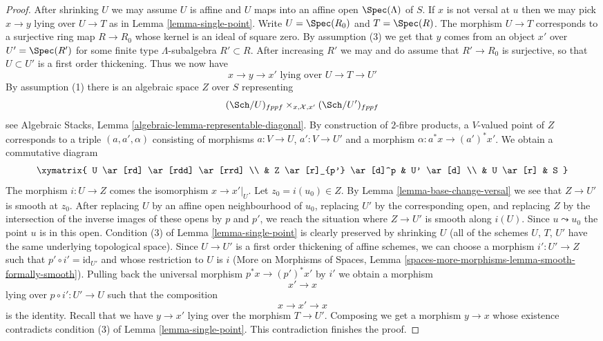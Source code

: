 \begin{proof}
After shrinking $U$ we may assume $U$ is affine and $U$ maps into an
affine open $\Spec(\Lambda)$ of $S$. If $x$ is not versal at $u$ then
we may pick $x \to y$ lying over $U \to T$ as in
Lemma \ref{lemma-single-point}. Write $U = \Spec(R_0)$ and $T = \Spec(R)$.
The morphism $U \to T$ corresponds to a surjective ring map
$R \to R_0$ whose kernel is an ideal of square zero.
By assumption (3) we get that $y$ comes from an object $x'$ over
$U' = \Spec(R')$ for some finite type $\Lambda$-subalgebra
$R' \subset R$. After increasing $R'$ we may and do assume that
$R' \to R_0$ is surjective, so that $U \subset U'$ is a first order thickening.
Thus we now have
$$
x \to y \to x'
\text{ lying over }
U \to T \to U'
$$
By assumption (1) there is an algebraic space $Z$ over $S$ representing
$$
(\Sch/U)_{fppf} \times_{x, \mathcal{X}, x'} (\Sch/U')_{fppf}
$$
see Algebraic Stacks, Lemma \ref{algebraic-lemma-representable-diagonal}.
By construction of $2$-fibre products, a $V$-valued point of $Z$
corresponds to a triple $(a, a', \alpha)$ consisting of morphisms
$a : V \to U$, $a' : V \to U'$ and a morphism $\alpha : a^*x \to (a')^*x'$.
We obtain a commutative diagram
$$
\xymatrix{
U \ar[rd] \ar[rdd] \ar[rrd] \\
& Z \ar[r]_{p'} \ar[d]^p & U' \ar[d] \\
& U \ar[r] & S
}
$$
The morphism $i : U \to Z$ comes the isomorphism $x \to x'|_U$.
Let $z_0 = i(u_0) \in Z$. By Lemma \ref{lemma-base-change-versal}
we see that $Z \to U'$ is smooth at $z_0$. After replacing $U$ by an
affine open neighbourhood of $u_0$, replacing $U'$ by the corresponding
open, and replacing $Z$ by the intersection of the inverse images
of these opens by $p$ and $p'$, we reach the situation where
$Z \to U'$ is smooth along $i(U)$. Since $u \leadsto u_0$ the point
$u$ is in this open. Condition (3) of Lemma \ref{lemma-single-point}
is clearly preserved by shrinking $U$ (all of the schemes $U$, $T$, $U'$
have the same underlying topological space).
Since $U \to U'$ is a first order thickening of affine schemes,
we can choose a morphism $i' : U' \to Z$
such that $p' \circ i' = \text{id}_{U'}$ and
whose restriction to $U$ is $i$
(More on Morphisms of Spaces, Lemma
\ref{spaces-more-morphisms-lemma-smooth-formally-smooth}).
Pulling back the universal morphism $p^*x \to (p')^*x'$ by $i'$
we obtain a morphism
$$
x' \to x
$$
lying over $p \circ i' : U' \to U$ such that the composition
$$
x \to x' \to x
$$
is the identity. Recall that we have $y \to x'$ lying over
the morphism $T \to U'$. Composing we get a morphism
$y \to x$ whose existence contradicts condition
(3) of Lemma \ref{lemma-single-point}.
This contradiction finishes the proof.
\end{proof}






